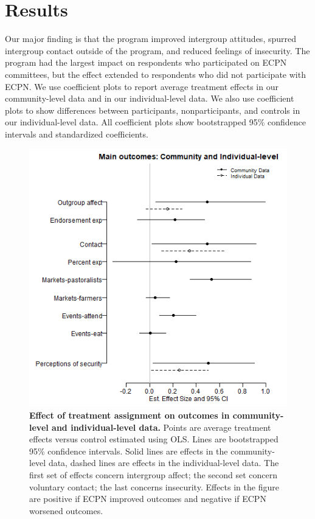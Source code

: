 \documentclass[11pt]{article}
\begin{document}
\hypertarget{results}{%
\section{Results}\label{results}}

Our major finding is that the program improved intergroup attitudes,
spurred intergroup contact outside of the program, and reduced feelings
of insecurity. The program had the largest impact on respondents who
participated on ECPN committees, but the effect extended to respondents
who did not participate with ECPN. We use coefficient plots to report
average treatment effects in our community-level data and in our
individual-level data. We also use coefficient plots to show differences
between participants, nonparticipants, and controls in our
individual-level data. All coefficient plots show bootstrapped 95\%
confidence intervals and standardized coefficients.

\begin{figure}[H]
\centering
\includegraphics[width=.7\textwidth]{../../../figs/ecpn_coefplots_MainOuts-cats.png}
\caption{\label{fig:fig1} \textbf{Effect of treatment assignment on outcomes in community-level and individual-level data.} Points are average treatment effects versus control estimated using OLS. Lines are bootstrapped 95\% confidence intervals.  Solid lines are effects in the community-level data, dashed lines are effects in the individual-level data.  The first set of effects concern intergroup affect; the second set concern voluntary contact; the last concerns insecurity.  Effects in the figure are positive if ECPN improved outcomes and negative if ECPN worsened outcomes.}
\end{figure}
\end{document}
